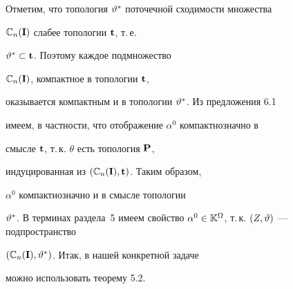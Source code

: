 Отметим, что топология $\vartheta^*$ поточечной сходимости множества


${\Bbb{C}_n}(\bold{I})$ слабее топологии $\bold{t}$, т.\,е.


$\vartheta^* \subset \bold{t}$. Поэтому каждое подмножество


${\Bbb{C}_n}(\bold{I})$, компактное в топологии $\bold{t}$,


оказывается компактным и в топологии $\vartheta^*$. Из предложения 6.1


имеем, в частности, что отображение ${\alpha}^0$ компактнозначно в


смысле $\bold{t}$, т.\,к. $\theta$ есть топология $\bold{P}$,


индуцированная из $({\Bbb{C}_n}(\bold{I}),\bold{t})$. Таким образом,


${\alpha}^0$ компактнозначно и в смысле топологии


$\vt^*$. В терминах раздела~5 имеем свойство ${\alpha}^0 \in


{\Bbb{K}}^\Om$, т.\,к. $(Z,\vt)$ --- подпространство


$({\Bbb{C}_n}(\bold{I}),\vartheta^*)$. Итак, в нашей конкретной задаче


можно использовать теорему 5.2.








